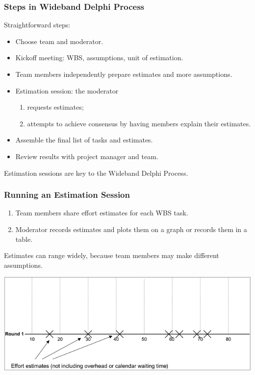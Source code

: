 \begin{frame}
\frametitle{Steps in Wideband Delphi Process}

\begin{changemargin}{1cm}

Straightforward steps:
\begin{itemize}
\item Choose team and moderator.
\item Kickoff meeting: WBS, assumptions, unit of estimation.
\item Team members independently prepare estimates and more assumptions.
\item Estimation session: the moderator
\begin{enumerate}
\item requests estimates;
\item attempts to achieve consensus by having members explain their estimates.
\end{enumerate}
\item Assemble the final list of tasks and estimates.
\item Review results with project manager and team.
\end{itemize}
Estimation sessions are key to the Wideband Delphi Process.
\end{changemargin}

\end{frame}

\begin{frame}
\frametitle{Running an Estimation Session}

\begin{changemargin}{1cm}

\begin{enumerate}
\item Team members share effort estimates for each WBS task.
\item Moderator records estimates and plots
them on a graph or records them in a table. 
\end{enumerate}

Estimates can range widely, because team members may make different
assumptions. 
\end{changemargin}

\includegraphics[width=\textwidth]{images/effort-estimates.png}

\end{frame}


